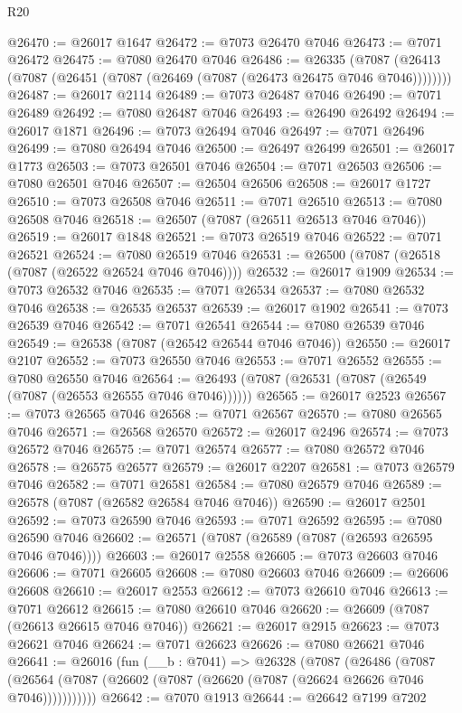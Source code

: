 \begin{lexlean}{R20}
\begin{coremodule}
{@26470 := @26017 @1647
@26472 := @7073 @26470 @7046
@26473 := @7071 @26472
@26475 := @7080 @26470 @7046
@26486 := @26335
    (@7087 (@26413 (@7087 (@26451 (@7087 (@26469 (@7087 (@26473 @26475 @7046 @7046))))))))
@26487 := @26017 @2114
@26489 := @7073 @26487 @7046
@26490 := @7071 @26489
@26492 := @7080 @26487 @7046
@26493 := @26490 @26492
@26494 := @26017 @1871
@26496 := @7073 @26494 @7046
@26497 := @7071 @26496
@26499 := @7080 @26494 @7046
@26500 := @26497 @26499
@26501 := @26017 @1773
@26503 := @7073 @26501 @7046
@26504 := @7071 @26503
@26506 := @7080 @26501 @7046
@26507 := @26504 @26506
@26508 := @26017 @1727
@26510 := @7073 @26508 @7046
@26511 := @7071 @26510
@26513 := @7080 @26508 @7046
@26518 := @26507 (@7087 (@26511 @26513 @7046 @7046))
@26519 := @26017 @1848
@26521 := @7073 @26519 @7046
@26522 := @7071 @26521
@26524 := @7080 @26519 @7046
@26531 := @26500 (@7087 (@26518 (@7087 (@26522 @26524 @7046 @7046))))
@26532 := @26017 @1909
@26534 := @7073 @26532 @7046
@26535 := @7071 @26534
@26537 := @7080 @26532 @7046
@26538 := @26535 @26537
@26539 := @26017 @1902
@26541 := @7073 @26539 @7046
@26542 := @7071 @26541
@26544 := @7080 @26539 @7046
@26549 := @26538 (@7087 (@26542 @26544 @7046 @7046))
@26550 := @26017 @2107
@26552 := @7073 @26550 @7046
@26553 := @7071 @26552
@26555 := @7080 @26550 @7046
@26564 := @26493 (@7087 (@26531 (@7087 (@26549 (@7087 (@26553 @26555 @7046 @7046))))))
@26565 := @26017 @2523
@26567 := @7073 @26565 @7046
@26568 := @7071 @26567
@26570 := @7080 @26565 @7046
@26571 := @26568 @26570
@26572 := @26017 @2496
@26574 := @7073 @26572 @7046
@26575 := @7071 @26574
@26577 := @7080 @26572 @7046
@26578 := @26575 @26577
@26579 := @26017 @2207
@26581 := @7073 @26579 @7046
@26582 := @7071 @26581
@26584 := @7080 @26579 @7046
@26589 := @26578 (@7087 (@26582 @26584 @7046 @7046))
@26590 := @26017 @2501
@26592 := @7073 @26590 @7046
@26593 := @7071 @26592
@26595 := @7080 @26590 @7046
@26602 := @26571 (@7087 (@26589 (@7087 (@26593 @26595 @7046 @7046))))
@26603 := @26017 @2558
@26605 := @7073 @26603 @7046
@26606 := @7071 @26605
@26608 := @7080 @26603 @7046
@26609 := @26606 @26608
@26610 := @26017 @2553
@26612 := @7073 @26610 @7046
@26613 := @7071 @26612
@26615 := @7080 @26610 @7046
@26620 := @26609 (@7087 (@26613 @26615 @7046 @7046))
@26621 := @26017 @2915
@26623 := @7073 @26621 @7046
@26624 := @7071 @26623
@26626 := @7080 @26621 @7046
@26641 := @26016
    (fun (__b : @7041) =>
    @26328
      (@7087
        (@26486
          (@7087 (@26564 (@7087 (@26602 (@7087 (@26620 (@7087 (@26624 @26626 @7046 @7046)))))))))))
@26642 := @7070 @1913
@26644 := @26642 @7199 @7202
}
\end{coremodule}
\end{lexlean}

